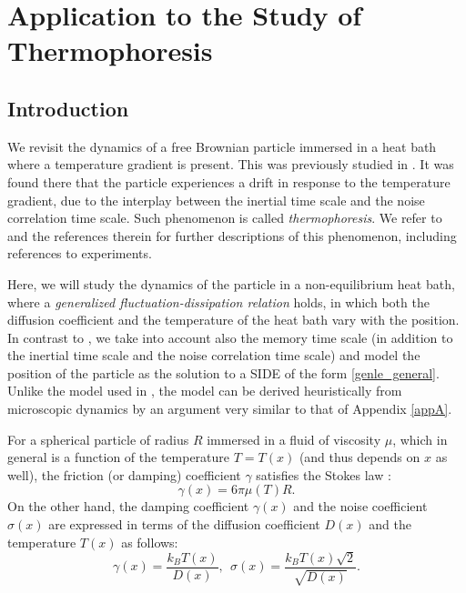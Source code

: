 

\section{Application to the Study of Thermophoresis} \label{sec:thermophoresis}
\subsection{Introduction}
We revisit the dynamics of a free Brownian particle immersed in a heat bath where a temperature gradient is present. This was previously studied in \cite{Hottovy2012a}. It was found there that the particle experiences a drift in response to the temperature gradient, due to the interplay between the inertial time scale and the noise correlation time scale. Such phenomenon is called {\it thermophoresis}. We refer to \cite{Hottovy2012a,piazza2008thermophoresis} and the references therein for further descriptions of this phenomenon, including references to experiments.

Here, we will study the dynamics of the particle in a non-equilibrium heat bath, where a {\it generalized fluctuation-dissipation relation} holds, in which  both the diffusion coefficient and the temperature of the heat bath vary with the position. In contrast to \cite{Hottovy2012a}, we take into account also the memory time scale (in addition to the inertial time scale and the noise correlation time scale) and model the position of the particle as the solution to a SIDE of the form \eqref{genle_general}.  Unlike the model used in \cite{Hottovy2012a}, the model can be derived heuristically from microscopic dynamics by an argument very similar to that of Appendix \ref{appA}. 


For a spherical particle of radius $R$ immersed in a fluid of viscosity $\mu$, which in general is a function of the temperature $T = T(x)$ (and thus depends on $x$ as well), the friction (or damping) coefficient $\gamma$ satisfies the Stokes law \cite{toda2012statistical}:
\begin{equation} \label{stokes}
\gamma(x) = 6 \pi \mu(T) R.
\end{equation}
On the other hand, the damping coefficient $\gamma(x)$ and the noise coefficient $\sigma(x)$ are expressed in terms of the diffusion coefficient $D(x)$ and the temperature $T(x)$ as follows: 
\begin{equation} \label{coeff_fd}
\gamma(x) = \frac{k_{B}T(x)}{D(x)}, \ \ \sigma(x) = \frac{k_{B}T(x) \sqrt{2}}{\sqrt{D(x)}}.\end{equation}


